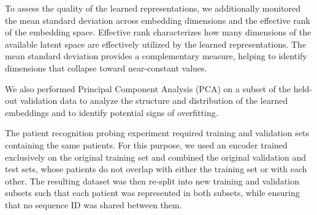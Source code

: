 \documentclass[11pt,a4paper]{article}
\begin{document}
To assess the quality of the learned representations, we additionally monitored the mean standard deviation across embedding dimensions and the effective rank of the embedding space. Effective rank characterizes how many dimensions of the available latent space are effectively utilized by the learned representations. The mean standard deviation provides a complementary measure, helping to identify dimensions that collapse toward near-constant values.

We also performed Principal Component Analysis (PCA) on a subset of the held-out validation data to analyze the structure and distribution of the learned embeddings and to identify potential signs of overfitting.

The patient recognition probing experiment required training and validation sets containing the same patients. For this purpose, we used an encoder trained exclusively on the original training set and combined the original validation and test sets, whose patients do not overlap with either the training set or with each other. The resulting dataset was then re-split into new training and validation subsets such that each patient was represented in both subsets, while ensuring that no sequence ID was shared between them.





\end{document}

